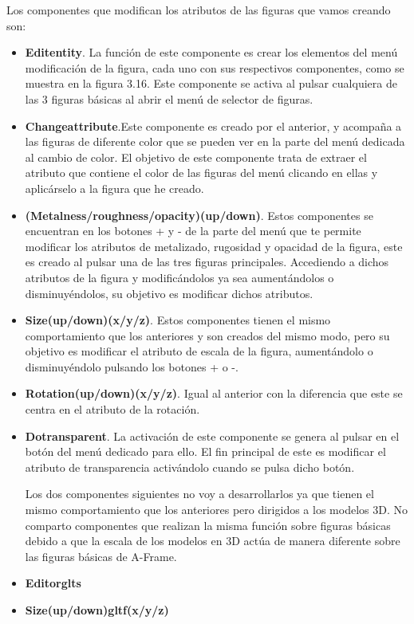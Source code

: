 \documentclass[a4paper, 12pt]{book}
\begin{document}
Los componentes que modifican los atributos de las figuras que vamos creando son:
\begin{itemize}
    \item \textbf{Editentity}. La función de este componente es crear los elementos del menú modificación de la figura, cada uno con sus respectivos componentes, como se muestra en la figura 3.16. Este componente se activa al pulsar cualquiera de las 3 figuras básicas al abrir el menú de selector de figuras. 
    
    \item \textbf{Changeattribute}.Este componente es creado por el anterior, y acompaña a las figuras de diferente color que se pueden ver en la parte del menú dedicada al cambio de color. El objetivo de este componente trata de extraer el atributo que contiene el color de las figuras del menú clicando en ellas y aplicárselo a la figura que he creado. 
    
    \item \textbf{(Metalness/roughness/opacity)(up/down)}. Estos componentes se encuentran en los botones + y - de la parte del menú que te permite modificar los atributos de metalizado, rugosidad y opacidad de la figura, este es creado al pulsar una de las tres figuras principales. Accediendo a dichos atributos de la figura y modificándolos ya sea aumentándolos o disminuyéndolos, su objetivo es modificar dichos atributos.
    
    \item \textbf{Size(up/down)(x/y/z)}. Estos componentes tienen el mismo comportamiento que los anteriores y son creados del mismo modo, pero su objetivo es modificar el atributo de escala de la figura, aumentándolo o disminuyéndolo pulsando los botones + o -.
    
    \item \textbf{Rotation(up/down)(x/y/z)}. Igual al anterior con la diferencia que este se centra en el atributo de la rotación.
    
    \item \textbf{Dotransparent}. La activación de este componente se genera al pulsar en el botón del menú dedicado para ello. El fin principal de este es modificar el atributo de transparencia  activándolo cuando se pulsa dicho botón.
    
    Los dos componentes siguientes no voy a desarrollarlos ya que tienen el mismo comportamiento que los anteriores pero dirigidos a los modelos 3D. No comparto componentes que realizan la misma función sobre figuras básicas debido a que la escala de los modelos en 3D actúa de manera diferente sobre las figuras básicas de A-Frame.
    \item \textbf{Editorglts}
    \item \textbf{Size(up/down)gltf(x/y/z)}
\end{itemize}
\end{document}

